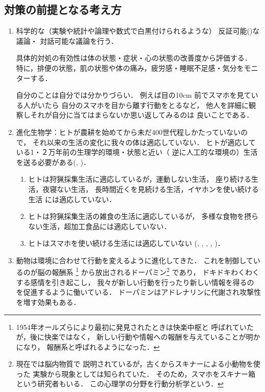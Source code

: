 \subsection{対策の前提となる考え方}
\begin{enumerate}
  \item 
   科学的な（実験や統計や論理や数式で白黒付けられるような）
   反証可能(\cite{PK})な議論・
   対話可能な議論を行う．
   
   具体的対処の有効性は体の状態・症状・心の状態の改善度から評価する．
   特に，排便の状態，肌の状態や体の痛み，疲労感・睡眠不足感・気分をモニターする．
   
   自分のことは自分では分かりづらい．
   例えば目の10cm 前でスマホを見ている人がいたら
   自分のスマホを目から離す行動をとるなど，
   他人を詳細に観察しそれが自分に当てはまらないか思い返してみるのは
   良いことである．
   
   \item 
   進化生物学：ヒトが農耕を始めてから未だ400世代程しかたっていないので，
   それ以来の生活の変化に我々の体は適応していない．
   ヒトが適応している1・２万年前の生理学的環境・状態と近い（
   逆に人工的な環境の）生活を送る必要がある(\cite{KL}, \cite{L})．
   
   \begin{enumerate}
      \item 
      ヒトは狩猟採集生活に適応しているが，運動しない生活，
      座り続ける生活，夜寝ない生活，
      長時間近くを見続ける生活，イヤホンを使い続ける生活
      には適応していない．
      
      \item 
      ヒトは狩猟採集生活の雑食の生活に適応しているが，
      多様な食物を摂らない生活，超加工食品には適応していない．
      
      \item 
      ヒトはスマホを使い続ける生活には適応していない
      (\cite{Han}, \cite{I}, \cite{Ko}, \cite{KS}, \cite{M2})．
   \end{enumerate}
   	
   \item 
   動物は環境に合わせて行動を変えるように進化してきた．
   これを制御しているのが脳の報酬系
   \footnote{1954年オールズらにより最初に発見されたときは快楽中枢と
   呼ばれていたが，後に快楽ではなく，
   新しい行動や情報への報酬を与えていることが明かになり，
   報酬系と呼ばれるようになった．}
   から放出されるドーパミン\footnote{現在では脳内物質で
   説明されているが，古くからスキナーによる小動物を使った
   実験から現象としては知られていた．
   そのため，スマホをスキナー箱という研究者もいる．
   この心理学の分野を行動分析学\cite{M}という．}
   であり，
   ドキドキわくわくする感情を引き起こし，
   我々が新しい行動を行ったり新しい情報を得るのを促進するように働いている．
   ドーパミンはアドレナリンに代謝され攻撃性を増す効果もある．
   

\end{enumerate}
